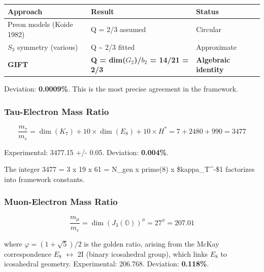 \documentclass[11pt,a4paper]{article}
\begin{document}
\begin{longtable}[]{@{}
  >{\raggedright\arraybackslash}p{}
  >{\raggedright\arraybackslash}p{}
  >{\raggedright\arraybackslash}p{}@{}}
\toprule\noalign{}
\begin{minipage}[b]{\linewidth}\raggedright
Approach
\end{minipage} & \begin{minipage}[b]{\linewidth}\raggedright
Result
\end{minipage} & \begin{minipage}[b]{\linewidth}\raggedright
Status
\end{minipage} \\
\midrule\noalign{}
\endhead
\bottomrule\noalign{}
\endlastfoot
Preon models (Koide 1982) & Q = 2/3 assumed & Circular \\
\(S_{3}\) symmetry (various) & Q \textasciitilde{} 2/3 fitted &
Approximate \\
\textbf{GIFT} & \textbf{Q = dim(\(G_{2}\))/\(b_{2}\) = 14/21 = 2/3} &
\textbf{Algebraic identity} \\
\end{longtable}


Deviation: \textbf{0.0009\%}. This is the most precise agreement in the
framework.

\subsubsection{Tau-Electron Mass Ratio}

\[\frac{m_\tau}{m_e} = \dim(K_7) + 10 \times \dim(E_8) + 10 \times H^* = 7 + 2480 + 990 = 3477\]

Experimental: 3477.15 +/- 0.05. Deviation: \textbf{0.004\%}.

The integer 3477 = 3 x 19 x 61 = N\_gen x prime(8) x \$kappa\_T\^{}-\$1
factorizes into framework constants.

\subsubsection{Muon-Electron Mass Ratio}

\[\frac{m_\mu}{m_e} = \dim(J_3(\mathbb{O}))^\phi = 27^\phi = 207.01\]

where \(\varphi = (1+\sqrt{5})/2\) is the golden ratio, arising from the McKay
correspondence \(E_{8}\) \(\leftrightarrow\) 2I (binary icosahedral
group), which links \(E_{8}\) to icosahedral geometry. Experimental:
206.768. Deviation: \textbf{0.118\%}.
\end{document}

